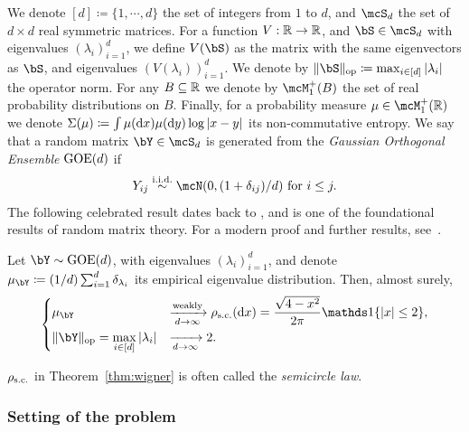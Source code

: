 We denote $[d] \coloneqq \{1, \cdots, d\}$ the set of integers from $1$ to $d$,
and $\mcS_d$ the set of $d \times d$ real symmetric matrices.
For a function $V : \mathbb{R} \to \mathbb{R}$, and $\bS \in \mcS_d$ with eigenvalues $(\lambda_i)_{i=1}^d$, we define $V(\bS)$ as the matrix with the same eigenvectors as $\bS$,
and eigenvalues $(V(\lambda_i))_{i=1}^d$. 
We denote by $\|\bS\|_{\op} \coloneqq \max_{i \in [d]}|\lambda_i|$ the operator norm.
For any $B \subseteq \mathbb{R}$ we denote by $\mcM_1^+(B)$ the set of real probability distributions on $B$.
Finally, for a probability measure $\mu \in \mcM_1^+(\bbR)$ we denote $\Sigma(\mu) \coloneqq \int \mu(\mathrm{d} x) \mu(\mathrm{d} y) \log |x - y|$ its non-commutative entropy.
We say that a random matrix $\bY \in \mcS_d$ is generated from the \emph{Gaussian Orthogonal Ensemble} $\mathrm{GOE}(d)$ if
\begin{equation*}
    Y_{ij} \iid \mcN(0, (1+\delta_{ij})/d) \textrm{ for } i \leq j.
\end{equation*}
The following celebrated result dates back to \cite{wigner1955characteristic}, and is one of the foundational results of random matrix theory. 
For a modern proof and further results, see~\cite{anderson2010introduction}.
\begin{theorem}\label{thm:wigner}
    Let $\bY \sim \GOE(d)$, with eigenvalues $(\lambda_i)_{i=1}^d$, and denote $\mu_\bY \coloneqq (1/d) \sum_{i=1}^d \delta_{\lambda_i}$ its empirical eigenvalue distribution.
    Then, almost surely,
    \begin{equation*}
        \begin{dcases}
            \mu_\bY &\xrightarrow[d \to \infty]{\textrm{weakly}} \rho_{\sci}(\rd x) = \frac{\sqrt{4-x^2}}{2\pi} \indi\{|x| \leq 2\}, \\
            \|\bY\|_\op = \max_{i \in [d]} |\lambda_i| &\xrightarrow[d \to \infty]{} 2.
        \end{dcases}
    \end{equation*}
\end{theorem}
\noindent
$\rho_{\mathrm{s.c.}}$ in Theorem~\ref{thm:wigner} is often called the \emph{semicircle law}.

\subsubsection{Setting of the problem} 

